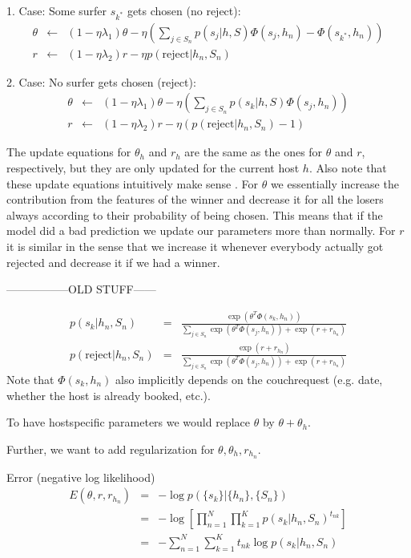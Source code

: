 1. Case: Some surfer $s_{k^*}$ gets chosen (no reject):
\begin{eqnarray}
\theta &\leftarrow& (1- \eta \lambda_1) \theta - \eta (\sum_{j \in S_n} p(s_j | h, S) \Phi(s_j,h_n) - \Phi(s_{k^*},h_n))\\
r &\leftarrow& (1- \eta \lambda_2) r - \eta p(\text{reject} | h_n, S_n)
\end{eqnarray}

2. Case: No surfer gets chosen (reject):
\begin{eqnarray}
\theta &\leftarrow& (1- \eta \lambda_1) \theta - \eta (\sum_{j \in S_n} p(s_k | h, S) \Phi(s_j,h_n))\\
r &\leftarrow& (1- \eta \lambda_2) r - \eta (p(\text{reject} | h_n, S_n)-1)
\end{eqnarray}

The update equations for $\theta_h$ and $r_h$ are the same as the ones for $\theta$ and $r$, respectively, but they are only updated for the current host $h$. 
Also note that these update equations intuitively make sense . For $\theta$ we essentially increase the contribution from the features of the winner and decrease it for all the losers always according to their probability of being chosen. This means that if the model did a bad prediction we update our parameters more than normally. For $r$ it is similar in the sense that we increase it whenever everybody actually got rejected and decrease it if we had a winner.


-----------------OLD STUFF------

\begin{eqnarray}
p(s_k | h_n, S_n) &=& \frac{\exp(\theta^T \Phi(s_k,h_n))}{\sum_{j \in S_n} \exp(\theta^T \Phi(s_j,h_n)) + \exp(r + r_{h_n})} \\
p(\text{reject} | h_n, S_n) &=& \frac{\exp(r+r_{h_n})}{\sum_{j \in S_n} \exp(\theta^T \Phi(s_j,h_n)) + \exp(r + r_{h_n})}
\end{eqnarray}
Note that $\Phi(s_k,h_n)$ also implicitly depends on the couchrequest (e.g. date, whether the host is already booked, etc.).

To have hostspecific parameters we would replace $\theta$ by $\theta + \theta_h$. 

Further, we want to add regularization for $\theta, \theta_h, r_{h_n}$.

Error (negative log likelihood)
\begin{eqnarray}
E(\theta, r, r_{h_n}) &=& - \log p(\{s_k\} | \{h_n\}, \{S_n\})\\
&=& - \log [ \prod_{n=1}^N \prod_{k=1}^K p(s_k | h_n, S_n)^{t_{nk}}]\\
&=&  - \sum_{n=1}^N \sum_{k=1}^K t_{nk} \log p(s_k | h_n, S_n)
\end{eqnarray}

